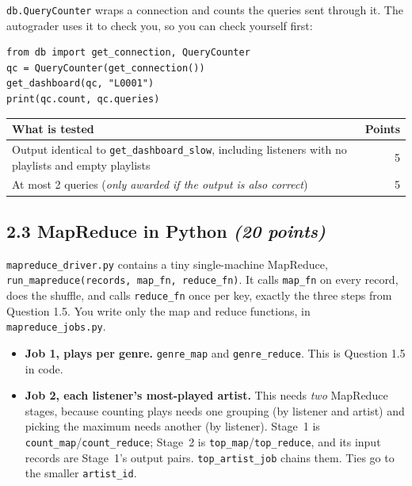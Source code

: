 \documentclass[11pt]{article}
\newcommand{\code}[1]{\texttt{#1}}
\newcommand{\pts}[1]{\hfill\textit{(#1 points)}}
\begin{document}
\code{db.QueryCounter} wraps a connection and counts the queries sent through
it. The autograder uses it to check you, so you can check yourself first:

\begin{lstlisting}[style=py]
from db import get_connection, QueryCounter
qc = QueryCounter(get_connection())
get_dashboard(qc, "L0001")
print(qc.count, qc.queries)
\end{lstlisting}

\begin{center}
\small
\begin{tabularx}{\linewidth}{@{}X r@{}}
\toprule
\textbf{What is tested} & \textbf{Points}\\
\midrule
Output identical to \code{get\_dashboard\_slow}, including listeners with no playlists and empty playlists & 5\\
At most 2 queries (\emph{only awarded if the output is also correct}) & 5\\
\bottomrule
\end{tabularx}
\end{center}

\subsection*{2.3 MapReduce in Python \pts{20}}

\code{mapreduce\_driver.py} contains a tiny single-machine MapReduce,
\code{run\_mapreduce(records, map\_fn, reduce\_fn)}. It calls \code{map\_fn} on
every record, does the shuffle, and calls \code{reduce\_fn} once per key,
exactly the three steps from Question 1.5. You write only the map and reduce functions,
in \code{mapreduce\_jobs.py}.

\begin{itemize}
  \item \textbf{Job 1, plays per genre.} \code{genre\_map} and
  \code{genre\_reduce}. This is Question 1.5 in code.
  \item \textbf{Job 2, each listener's most-played artist.} This needs
  \emph{two} MapReduce stages, because counting plays needs one grouping (by
  listener and artist) and picking the maximum needs another (by listener).
  Stage~1 is \code{count\_map}/\code{count\_reduce}; Stage~2 is
  \code{top\_map}/\code{top\_reduce}, and its input records are Stage~1's output
  pairs. \code{top\_artist\_job} chains them. Ties go to the smaller
  \code{artist\_id}.
\end{itemize}
\end{document}
